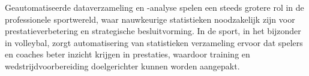 



Geautomatiseerde dataverzameling en -analyse spelen een steeds grotere rol in de professionele sportwereld, waar nauwkeurige statistieken noodzakelijk zijn voor prestatieverbetering en strategische besluitvorming. In de sport, in het bijzonder in volleybal, zorgt automatisering van statistieken verzameling ervoor dat spelers en coaches beter inzicht krijgen in prestaties, waardoor training en wedstrijdvoorbereiding doelgerichter kunnen worden aangepakt.

